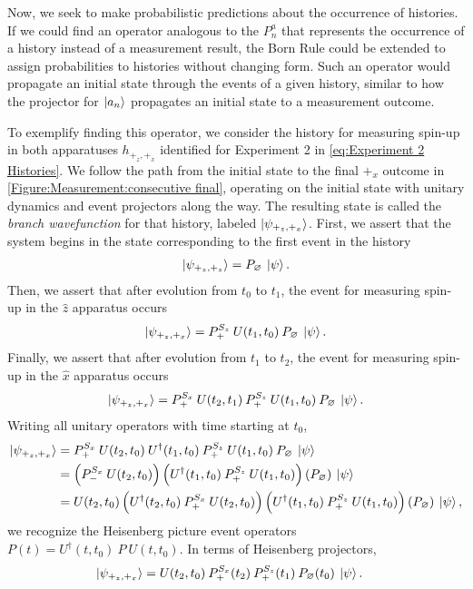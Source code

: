 Now, we seek to make probabilistic predictions about the occurrence of histories. If we could find an operator analogous to the $P^a_n$ that represents the occurrence of a history instead of a measurement result, the Born Rule could be extended to assign probabilities to histories without changing form. Such an operator would propagate an initial state through the events of a given history, similar to how the projector for $\ket{a_n}$ propagates an initial state to a measurement outcome.

To exemplify finding this operator, we consider the history for measuring spin-up in both apparatuses $h_{+_z, +_x}$ identified for Experiment 2 in \autoref{eq:Experiment 2 Histories}. We follow the path from the initial state to the final $+_x$ outcome in \autoref{Figure:Measurement:consecutive final}, operating on the initial state with unitary dynamics and event projectors along the way. The resulting state is called the \textit{branch wavefunction} for that history, labeled $\ket{\psi_{+_z, +_x}}$.  First, we assert that the system begins in the state corresponding to the first event in the history
\begin{align}
  \ket{\psi_{+_z, +_z}} = P_\varnothing \: \ket{\psi}.
\end{align}
Then, we assert that after evolution from $t_0$ to $t_1$, the event for measuring spin-up in the $\hat{z}$ apparatus occurs
\begin{align}
  \ket{\psi_{+_z, +_x}} = P^{S_z}_+ \: U(t_1, t_0) \: P_\varnothing \: \ket{\psi}.
\end{align}
Finally, we assert that after evolution from $t_1$ to $t_2$, the event for measuring spin-up in the $\hat{x}$ apparatus occurs
\begin{align}
  \ket{\psi_{+_z, +_x}} = P^{S_x}_+ \: U(t_2, t_1) \: P^{S_z}_+ \: U(t_1, t_0) \: P_\varnothing \: \ket{\psi}.
\end{align}
Writing all unitary operators with time starting at $t_0$,
\begin{align}
  \ket{\psi_{+_z, +_x}} &= P^{S_x}_+ \: U(t_2, t_0) \: U^\dagger(t_1, t_0) \: P^{S_z}_+ \: U(t_1, t_0) \: P_\varnothing \: \ket{\psi} \\ \nonumber
  &= \left(P^{S_x}_- \: U(t_2, t_0) \right) \left( U^\dagger(t_1, t_0) \: P^{S_z}_+ \: U(t_1, t_0) \right) \left( P_\varnothing \right) \: \ket{\psi} \\ \nonumber
  &= U(t_2, t_0)\left(U^\dagger(t_2, t_0) \: P^{S_x}_+ \: U(t_2, t_0) \right) \left( U^\dagger(t_1, t_0) \: P^{S_z}_+ \: U(t_1, t_0) \right) \left( P_\varnothing \right) \: \ket{\psi},
\end{align}
we recognize the Heisenberg picture event operators ${P}(t) = U^\dagger(t, t_0) \: P \: U(t, t_0)$. In terms of Heisenberg projectors,
\begin{align} \label{eq:branch wavefunction}
  \ket{\psi_{+_z, +_x}} &= U(t_2, t_0) \: {P^{S_x}_+(t_2)} \: {P^{S_z}_+(t_1)} \: {P_\varnothing(t_0)} \: \ket{\psi}.
\end{align}

